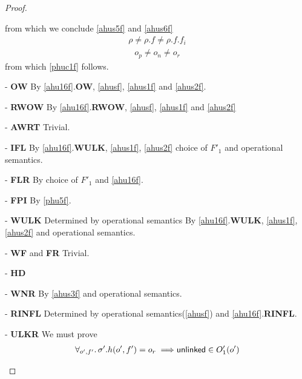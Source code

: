 \begin{proof}
\begin{case}
from which we conclude \ref{ahus5f} and \ref{ahus6f}
  \begin{gather}\label{ahus5f}
    \rho \neq \rho.f \neq \rho.f.f_i
  \end{gather}
    \begin{gather}\label{ahus6f}
    o_p \neq o_n \neq o_r 
  \end{gather}
from which \ref{phuc1f} follows.
\end{case}
\begin{case} - \textbf{OW} By \ref{ahu16f}.\textbf{OW}, \ref{ahusf}, \ref{ahus1f} and \ref{ahus2f}.
\end{case}
\begin{case} - \textbf{RWOW} By \ref{ahu16f}.\textbf{RWOW}, \ref{ahusf}, \ref{ahus1f} and \ref{ahus2f}
\end{case}
\begin{case} - \textbf{AWRT} Trivial.
\end{case}
\begin{case} - \textbf{IFL}  By \ref{ahu16f}.\textbf{WULK}, \ref{ahus1f}, \ref{ahus2f} choice of $F'_1$ and operational semantics.
\end{case}
\begin{case} - \textbf{FLR} By choice of $F'_1$ and \ref{ahu16f}. 
\end{case}
\begin{case} - \textbf{FPI} By \ref{phu5f}.
\end{case}
\begin{case} - \textbf{WULK} Determined by operational semantics By \ref{ahu16f}.\textbf{WULK}, \ref{ahus1f}, \ref{ahus2f} and operational semantics.
\end{case}
\begin{case} - \textbf{WF} and \textbf{FR} Trivial.
\end{case}
\begin{case} - \textbf{HD} 
\end{case}
\begin{case} - \textbf{WNR} By \ref{ahus3f} and operational semantics.
\end{case}
\begin{case} - \textbf{RINFL} Determined by operational semantics(\ref{ahusf}) and \ref{ahu16f}.\textbf{RINFL}.
\end{case}
\begin{case} - \textbf{ULKR} We must prove 
  \begin{gather}\label{phuc2f}
\begin{aligned}
\forall_{o',f'} \ldotp \sigma'.h(o',f') = o_r \implies &\textsf{unlinked} \in O'_1(o') \\

\end{aligned}
\end{gather}
\end{case}
\end{proof}
